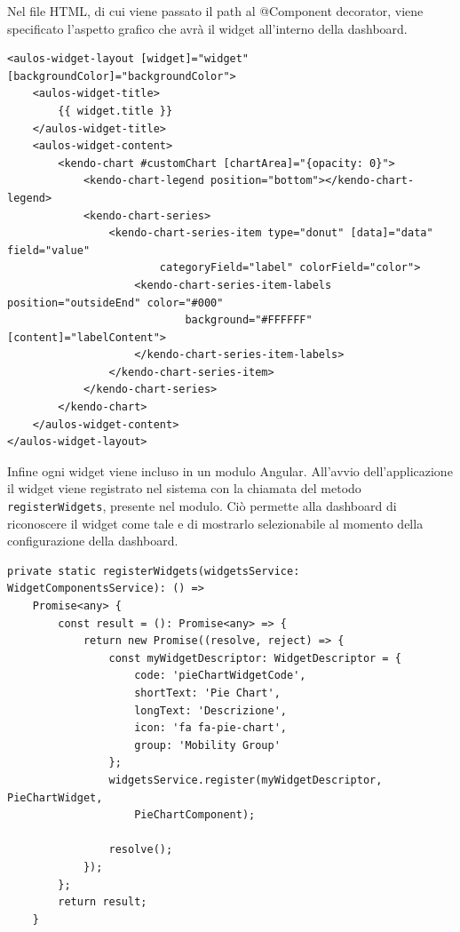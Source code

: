 Nel file HTML, di cui viene passato il path al @Component decorator, viene specificato l'aspetto grafico che avrà il widget all'interno della dashboard.   \\
\begin{lstlisting}[caption={File pie-chart.component.html}, style=javaScriptCode]
<aulos-widget-layout [widget]="widget" [backgroundColor]="backgroundColor">
    <aulos-widget-title>
        {{ widget.title }}
    </aulos-widget-title>
    <aulos-widget-content>
        <kendo-chart #customChart [chartArea]="{opacity: 0}">
            <kendo-chart-legend position="bottom"></kendo-chart-legend>
            <kendo-chart-series>
                <kendo-chart-series-item type="donut" [data]="data" field="value" 
                        categoryField="label" colorField="color">
                    <kendo-chart-series-item-labels position="outsideEnd" color="#000" 
                            background="#FFFFFF" [content]="labelContent">
                    </kendo-chart-series-item-labels>
                </kendo-chart-series-item>
            </kendo-chart-series>
        </kendo-chart>
    </aulos-widget-content>
</aulos-widget-layout>
\end{lstlisting}
Infine ogni widget viene incluso in un modulo Angular. All'avvio dell'applicazione il widget viene registrato nel sistema con la chiamata del metodo \verb|registerWidgets|, presente nel modulo. Ciò permette alla dashboard di riconoscere il widget come tale e di mostrarlo selezionabile al momento della configurazione della dashboard. \\
\begin{lstlisting}[caption={Metodo all'interno del modulo che registra il widget nel sistema}, style=javaScriptCode]
private static registerWidgets(widgetsService: WidgetComponentsService): () => 
    Promise<any> {
        const result = (): Promise<any> => {
            return new Promise((resolve, reject) => {
                const myWidgetDescriptor: WidgetDescriptor = {
                    code: 'pieChartWidgetCode',
                    shortText: 'Pie Chart',
                    longText: 'Descrizione',
                    icon: 'fa fa-pie-chart',
                    group: 'Mobility Group'
                };
                widgetsService.register(myWidgetDescriptor, PieChartWidget, 
                    PieChartComponent);

                resolve();
            });
        };
        return result;
    }
\end{lstlisting}

